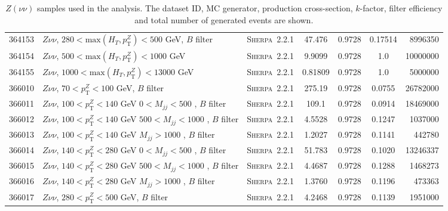 \begin{table}[!htb]
{\begin{tabular}{|c|l|c|c|c|c|r|}
    364153 & $Z \nu\nu $, $280<\text{max}(H_T,p_{\text{T}}^Z)<500$ GeV, $B$ filter & \textsc{Sherpa}~2.2.1 &            47.476   & 0.9728& 0.17514  &  8996350 \\
    364154 & $Z \nu\nu $, $500<\text{max}(H_T,p_{\text{T}}^Z)<1000$ GeV                      & \textsc{Sherpa}~2.2.1 &  9.9099   & 0.9728& 1.0 	 & 10000000 \\
    364155 & $Z \nu\nu $, $1000<\text{max}(H_T,p_{\text{T}}^Z)<13000$ GeV                      & \textsc{Sherpa}~2.2.1 &0.81809  & 0.9728& 1.0 	 &  5000000 \\
    \hline
    366010 & $Z \nu\nu $, $70<p_{\text{T}}^Z<100$ GeV, $B$ filter & \textsc{Sherpa}~2.2.1 & 275.19 & 0.9728 & 0.0755 & 26782000\\
    366011 & $Z \nu\nu $, $100<p_{\text{T}}^Z<140$ GeV $0<M_{jj}<500$ , $B$ filter & \textsc{Sherpa}~2.2.1 & 109.1 & 0.9728 & 0.0914 & 18469000\\
    366012 & $Z \nu\nu $, $100<p_{\text{T}}^Z<140$ GeV $500<M_{jj}<1000$ , $B$ filter &  \textsc{Sherpa}~2.2.1 & 4.5528 & 0.9728 & 0.1247 & 1037000\\
    366013 & $Z \nu\nu $, $100<p_{\text{T}}^Z<140$ GeV $M_{jj}>1000$ , $B$ filter &\textsc{Sherpa}~2.2.1 & 1.2027 & 0.9728 & 0.1141 & 442780\\
    366014 & $Z \nu\nu $, $140<p_{\text{T}}^Z<280$ GeV $0<M_{jj}<500$ , $B$ filter &  \textsc{Sherpa}~2.2.1 & 51.783 & 0.9728 & 0.1020 &  13246337\\
    366015 & $Z \nu\nu $, $140<p_{\text{T}}^Z<280$ GeV $500<M_{jj}<1000$ , $B$ filter &  \textsc{Sherpa}~2.2.1 & 4.4687 & 0.9728 & 0.1288 & 1468273\\
    366016 & $Z \nu\nu $, $140<p_{\text{T}}^Z<280$ GeV $M_{jj}>1000$ , $B$ filter &  \textsc{Sherpa}~2.2.1 & 1.3760 & 0.9728 & 0.1196 & 473363\\
    366017 & $Z \nu\nu $, $280<p_{\text{T}}^Z<500$ GeV, $B$ filter &  \textsc{Sherpa}~2.2.1 & 4.2468 & 0.9728 & 0.1139 & 1951000\\
    \hline
    \hline
  \end{tabular}
  \caption{$Z(\nu\nu)$ samples used in the analysis. The dataset ID, MC generator, production cross-section,
$k$-factor, filter efficiency and total number of generated events are shown.}
\label{tabular:mc_samples_Zvvjets}
}
\end{table}